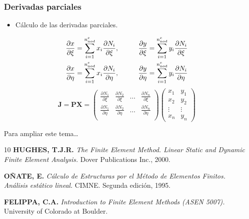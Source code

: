 \documentclass[10pt, aspectratio=43]{beamer}
\begin{document}
\begin{frame}
\frametitle{Derivadas parciales}
\begin{itemize}
\item Cálculo de las derivadas parciales.
\end{itemize}
\begin{alignat}{2}
\frac{\partial x}{\partial \xi}&=\sum_{i=1}^{n^e_{\textrm nod}}
x_i \frac{\partial N_i}{\partial \xi},\qquad
&
\frac{\partial y}{\partial \xi}&=\sum_{i=1}^{n^e_{\textrm nod}}
y_i \frac{\partial N_i}{\partial \xi} \\
%
\frac{\partial x}{\partial \eta}&=\sum_{i=1}^{n^e_{\textrm nod}}
x_i \frac{\partial N_i}{\partial \eta},\qquad
&
\frac{\partial y}{\partial \eta}&=\sum_{i=1}^{n^e_{\textrm nod}}
y_i \frac{\partial N_i}{\partial \eta}
\end{alignat}
\begin{equation}
\bm{J}=\mathbf{P}\mathbf{X}=
\left(
\begin{array}{cccc}
\frac{\partial N_1}{\partial \xi}&
\frac{\partial N_2}{\partial \xi}&
\ldots                           &
\frac{\partial N_n}{\partial \xi}\\
%
\frac{\partial N_1}{\partial \eta}&
\frac{\partial N_2}{\partial \eta}&
\ldots                           &
\frac{\partial N_n}{\partial \eta}\\
\end{array}
\right)
\left(
\begin{array}{cc}
x_1    & y_1 \\
x_2    & y_2 \\
\vdots & \vdots \\
x_n    & y_n
\end{array}
\right)
\end{equation}
\end{frame}


\begin{frame}{Para ampliar este tema\dots}{}
  \begin{thebibliography}{10}
    \textbf{HUGHES, T.J.R.}
    \newblock \emph{The Finite Element Method. Linear Static and Dynamic Finite Element Analysis.}
    \newblock Dover Publications Inc., 2000.
    \vspace{0.4cm}
    
    \textbf{OÑATE, E.}
    \newblock \emph{Cálculo de Estructuras por el Método de Elementos Finitos. Análisis estático lineal.}
    \newblock CIMNE. Segunda edición, 1995.
    \vspace{0.4cm}
    
    \textbf{FELIPPA, C.A.}
    \newblock \emph{Introduction to Finite Element Methods (ASEN 5007).}
    \newblock University of Colorado at Boulder.
  \end{thebibliography}
\end{frame}
\end{document}
